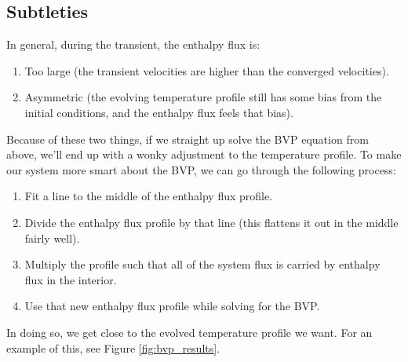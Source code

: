 \documentclass[aps, pre, onecolumn, nofootinbib, notitlepage, groupedaddress, amsfonts, amssymb, amsmath, longbibliography]{revtex4-1}
\begin{document}
\subsection{Subtleties}
In general, during the transient, the enthalpy flux is:
\begin{enumerate}
\item Too large (the transient velocities are higher than the converged velocities).
\item Asymmetric (the evolving temperature profile still has some bias from the initial
conditions, and the enthalpy flux feels that bias).
\end{enumerate}
Because of these two things, if we straight up solve the BVP equation from above, we'll end up
with a wonky adjustment to the temperature profile.  To make our system more smart about the
BVP, we can go through the following process:
\begin{enumerate}
\item Fit a line to the middle of the enthalpy flux profile.
\item Divide the enthalpy flux profile by that line (this flattens it out in the middle fairly well).
\item Multiply the profile such that all of the system flux is carried by enthalpy flux in the interior.
\item Use that new enthalpy flux profile while solving for the BVP.
\end{enumerate}
In doing so, we get close to the evolved temperature profile we want.  
For an example of this, see Figure \ref{fig:bvp_results}.
\end{document}
